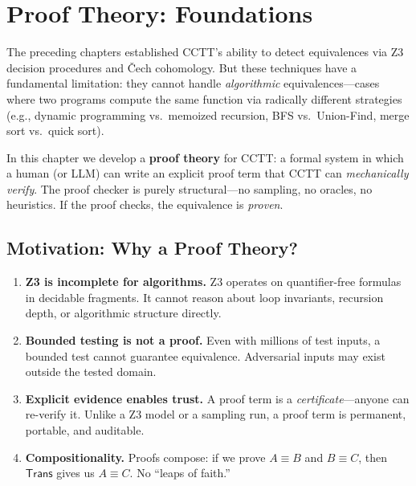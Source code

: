 
\chapter{Proof Theory: Foundations}
\label{ch:proof-theory-foundations}

The preceding chapters established CCTT's ability to detect equivalences
via Z3 decision procedures and \v{C}ech cohomology.  But these techniques
have a fundamental limitation: they cannot handle \emph{algorithmic}
equivalences---cases where two programs compute the same function via
radically different strategies (e.g., dynamic programming vs.\ memoized
recursion, BFS vs.\ Union-Find, merge sort vs.\ quick sort).

In this chapter we develop a \textbf{proof theory} for CCTT: a formal
system in which a human (or LLM) can write an explicit proof term that
CCTT can \emph{mechanically verify}.  The proof checker is purely
structural---no sampling, no oracles, no heuristics.  If the proof
checks, the equivalence is \emph{proven}.

\section{Motivation: Why a Proof Theory?}

\begin{enumerate}
\item \textbf{Z3 is incomplete for algorithms.}
Z3 operates on quantifier-free formulas in decidable fragments.
It cannot reason about loop invariants, recursion depth, or
algorithmic structure directly.

\item \textbf{Bounded testing is not a proof.}
Even with millions of test inputs, a bounded test cannot guarantee
equivalence.  Adversarial inputs may exist outside the tested domain.

\item \textbf{Explicit evidence enables trust.}
A proof term is a \emph{certificate}---anyone can re-verify it.
Unlike a Z3 model or a sampling run, a proof term is permanent,
portable, and auditable.

\item \textbf{Compositionality.}
Proofs compose: if we prove $A \equiv B$ and $B \equiv C$, then
$\mathsf{Trans}$ gives us $A \equiv C$.  No ``leaps of faith.''
\end{enumerate}

